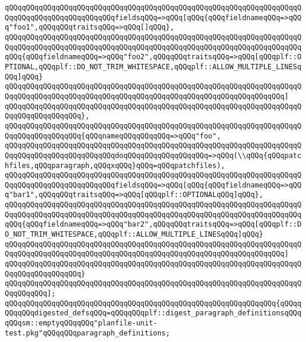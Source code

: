 \verb|qQQqqQQqqQQqqQQqqQQqqQQqqQQqqQQqqQQqqQQqqQQqqQQqqQQqqQQqqQQqqQQqqQQqqQQqqQQqqQQqqQQqqQQqqQQqqQQqfieldsqQQq=>qQQq[qQQq{qQQqfieldnameqQQq=>qQQq"foo1",qQQqqQQqtraitsqQQq=>qQQq[]qQQq},|\newline
\verb|qQQqqQQqqQQqqQQqqQQqqQQqqQQqqQQqqQQqqQQqqQQqqQQqqQQqqQQqqQQqqQQqqQQqqQQqqQQqqQQqqQQqqQQqqQQqqQQqqQQqqQQqqQQqqQQqqQQqqQQqqQQqqQQqqQQqqQQqqQQqqQQq{qQQqfieldnameqQQq=>qQQq"foo2",qQQqqQQqtraitsqQQq=>qQQq[qQQqplf::OPTIONAL,qQQqplf::DO_NOT_TRIM_WHITESPACE,qQQqplf::ALLOW_MULTIPLE_LINESqQQq]qQQq}|\newline
\verb|qQQqqQQqqQQqqQQqqQQqqQQqqQQqqQQqqQQqqQQqqQQqqQQqqQQqqQQqqQQqqQQqqQQqqQQqqQQqqQQqqQQqqQQqqQQqqQQqqQQqqQQqqQQqqQQqqQQqqQQqqQQqqQQqqQQqqQQq]|\newline
\verb|qQQqqQQqqQQqqQQqqQQqqQQqqQQqqQQqqQQqqQQqqQQqqQQqqQQqqQQqqQQqqQQqqQQqqQQqqQQqqQQqqQQqqQQq},|\newline
\newline
\verb|qQQqqQQqqQQqqQQqqQQqqQQqqQQqqQQqqQQqqQQqqQQqqQQqqQQqqQQqqQQqqQQqqQQqqQQqqQQqqQQqqQQqqQQq{qQQqnameqQQqqQQqqQQq=>qQQq"foo",|\newline
\verb|qQQqqQQqqQQqqQQqqQQqqQQqqQQqqQQqqQQqqQQqqQQqqQQqqQQqqQQqqQQqqQQqqQQqqQQqqQQqqQQqqQQqqQQqqQQqqQQqdoqQQqqQQqqQQqqQQqqQQq=>qQQq(\\qQQq{qQQqpatchfiles,qQQqparagraph,qQQqxqQQq}qQQq=qQQqpatchfiles),|\newline
\verb|qQQqqQQqqQQqqQQqqQQqqQQqqQQqqQQqqQQqqQQqqQQqqQQqqQQqqQQqqQQqqQQqqQQqqQQqqQQqqQQqqQQqqQQqqQQqqQQqfieldsqQQq=>qQQq[qQQq{qQQqfieldnameqQQq=>qQQq"bar1",qQQqqQQqtraitsqQQq=>qQQq[qQQqplf::OPTIONALqQQq]qQQq},|\newline
\verb|qQQqqQQqqQQqqQQqqQQqqQQqqQQqqQQqqQQqqQQqqQQqqQQqqQQqqQQqqQQqqQQqqQQqqQQqqQQqqQQqqQQqqQQqqQQqqQQqqQQqqQQqqQQqqQQqqQQqqQQqqQQqqQQqqQQqqQQqqQQqqQQq{qQQqfieldnameqQQq=>qQQq"bar2",qQQqqQQqtraitsqQQq=>qQQq[qQQqplf::DO_NOT_TRIM_WHITESPACE,qQQqplf::ALLOW_MULTIPLE_LINESqQQq]qQQq}|\newline
\verb|qQQqqQQqqQQqqQQqqQQqqQQqqQQqqQQqqQQqqQQqqQQqqQQqqQQqqQQqqQQqqQQqqQQqqQQqqQQqqQQqqQQqqQQqqQQqqQQqqQQqqQQqqQQqqQQqqQQqqQQqqQQqqQQqqQQqqQQq]|\newline
\verb|qQQqqQQqqQQqqQQqqQQqqQQqqQQqqQQqqQQqqQQqqQQqqQQqqQQqqQQqqQQqqQQqqQQqqQQqqQQqqQQqqQQqqQQq}|\newline
\verb|qQQqqQQqqQQqqQQqqQQqqQQqqQQqqQQqqQQqqQQqqQQqqQQqqQQqqQQqqQQqqQQqqQQqqQQqqQQqqQQq];|\newline
\newline
\verb|qQQqqQQqqQQqqQQqqQQqqQQqqQQqqQQqqQQqqQQqqQQqqQQqqQQqqQQqqQQqqQQq{qQQqqQQqqQQqdigested_defsqQQq=qQQqqQQqplf::digest_paragraph_definitionsqQQqqQQqsm::emptyqQQqqQQq"planfile-unit-test.pkg"qQQqqQQqparagraph_definitions;|\newline
